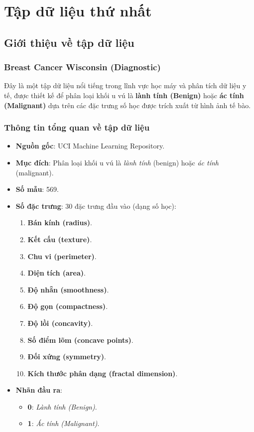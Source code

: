 \section{Tập dữ liệu thứ nhất}

\subsection{Giới thiệu về tập dữ liệu}

\subsubsection{Breast Cancer Wisconsin (Diagnostic)}
Đây là một tập dữ liệu nổi tiếng trong lĩnh vực học máy và phân tích dữ liệu y tế, được thiết kế để phân loại khối u vú là \textbf{lành tính (Benign)} hoặc \textbf{ác tính (Malignant)} dựa trên các đặc trưng số học được trích xuất từ hình ảnh tế bào.


\subsubsection{Thông tin tổng quan về tập dữ liệu}

\begin{itemize}
	\item \textbf{Nguồn gốc}: UCI Machine Learning Repository.
	\item \textbf{Mục đích}: Phân loại khối u vú là \textit{lành tính} (benign) hoặc \textit{ác tính} (malignant).
	\item \textbf{Số mẫu}: 569.
	\item \textbf{Số đặc trưng}: 30 đặc trưng đầu vào (dạng số học):
	\begin{enumerate}
		\item \textbf{Bán kính (radius)}.
		\item \textbf{Kết cấu (texture)}.
		\item \textbf{Chu vi (perimeter)}.
		\item \textbf{Diện tích (area)}.
		\item \textbf{Độ nhẵn (smoothness)}.
		\item \textbf{Độ gọn (compactness)}.
		\item \textbf{Độ lồi (concavity)}.
		\item \textbf{Số điểm lõm (concave points)}.
		\item \textbf{Đối xứng (symmetry)}.
		\item \textbf{Kích thước phân dạng (fractal dimension)}.
	\end{enumerate}
	
	\item \textbf{Nhãn đầu ra}:
	\begin{itemize}
		\item \textbf{0}: \textit{Lành tính (Benign)}.
		\item \textbf{1}: \textit{Ác tính (Malignant)}.
	\end{itemize}
\end{itemize}


